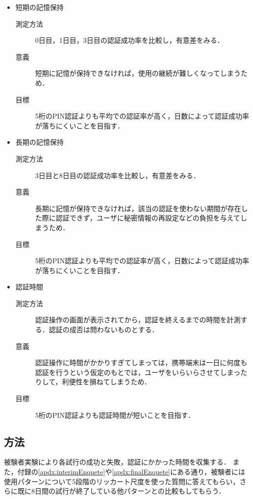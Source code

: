 \begin{itemize}
  \item 短期の記憶保持
    \begin{description}
      \item[測定方法] 0日目，1日目，3日目の認証成功率を比較し，有意差をみる．
      \item[意義] 短期に記憶が保持できなければ，使用の継続が難しくなってしまうため．
      \item[目標] 5桁のPIN認証よりも平均での認証率が高く，日数によって認証成功率が落ちにくいことを目指す．
    \end{description}
  \item 長期の記憶保持
    \begin{description}
      \item[測定方法] 3日目と8日目の認証成功率を比較し，有意差をみる．
      \item[意義] 長期に記憶が保持できなければ，該当の認証を使わない期間が存在した際に認証できず，ユーザに秘密情報の再設定などの負担を与えてしまうため．
      \item[目標] 5桁のPIN認証よりも平均での認証率が高く，日数によって認証成功率が落ちにくいことを目指す．
    \end{description}
  \item 認証時間
    \begin{description}
      \item[測定方法] 認証操作の画面が表示されてから，認証を終えるまでの時間を計測する．認証の成否は問わないものとする．
      \item[意義] 認証操作に時間がかかりすぎてしまっては，携帯端末は一日に何度も認証を行うという仮定のもとでは，ユーザをいらいらさせてしまったりして，利便性を損ねてしまうため．
      \item[目標] 5桁のPIN認証よりも認証時間が短いことを目指す．
    \end{description}
\end{itemize}

\subsection{方法}
被験者実験により各試行の成功と失敗，認証にかかった時間を収集する．
また，付録の\ref{apdx:interimEnquete}や\ref{apdx:finalEnquete}にある通り，被験者には使用パターンについて5段階のリッカート尺度を使った質問に答えてもらい，さらに既に8日間の試行が終了している他パターンとの比較もしてもらう．


